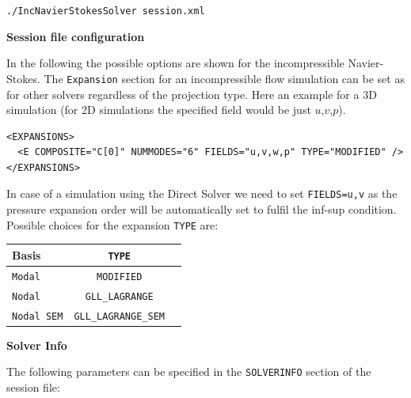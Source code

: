 \texttt{./IncNavierStokesSolver session.xml}

\textbf{Session file configuration}

In the following the possible options are shown for the incompressible Navier-Stokes. The \texttt{Expansion} section for an incompressible flow simulation can be set as for other solvers regardless of the projection type. Here an example for a 3D simulation (for 2D simulations the specified field would be just $u$,$v$,$p$).

\begin{lstlisting}[style=XMLStyle]
<EXPANSIONS>
  <E COMPOSITE="C[0]" NUMMODES="6" FIELDS="u,v,w,p" TYPE="MODIFIED" />
</EXPANSIONS>
\end{lstlisting}

In case of a simulation using the Direct Solver we need to set \texttt{FIELDS=u,v} as the pressure expansion order will be automatically set to fulfil the inf-sup condition.
Possible choices for the expansion \texttt{TYPE} are:

\begin{table}
\begin{center}
\begin{tabular}{|l|c|c|} \hline
{Basis} & {\texttt{TYPE}} \\ \hline
\texttt{Modal} & \texttt{MODIFIED} \\ \hline
\texttt{Nodal} & \texttt{GLL\_LAGRANGE} \\ \hline
\texttt{Nodal SEM} & \texttt{GLL\_LAGRANGE\_SEM} \\ \hline
\end{tabular}
\end{center}
\end{table}

\textbf{Solver Info}

The following parameters can be specified in the \texttt{SOLVERINFO} section of the session file: 

